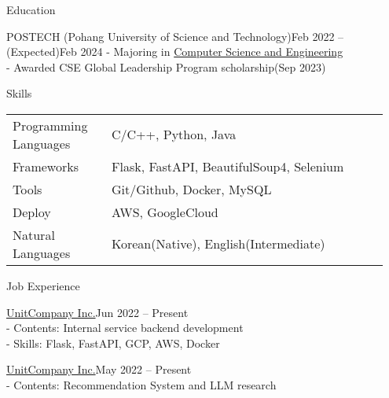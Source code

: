 \documentclass{resume}
\begin{document}
\begin{rSection}{Education}
    \begin{rSubsection}{POSTECH (Pohang University of Science and Technology)}{Feb 2022 -- (Expected)Feb 2024}
        - Majoring in \href{https://cse.postech.ac.kr}{Computer Science and Engineering} \\
        - Awarded CSE Global Leadership Program scholarship(Sep 2023)
    \end{rSubsection}
\end{rSection}

\begin{rSection}{Skills}
    \begin{tabular}{@{}p{0.25\linewidth}p{0.7\linewidth}}
        Programming Languages
            & C/C++, Python, Java \\ [0.3em]
        Frameworks
            & Flask, FastAPI, BeautifulSoup4, Selenium \\ [0.3em]
        Tools
            & Git/Github, Docker, MySQL \\ [0.3em]
        Deploy
            & AWS, GoogleCloud \\ [0.3em]
        Natural Languages
            & Korean(Native), English(Intermediate)
    \end{tabular}
\end{rSection}

\begin{rSection}{Job Experience}
    \begin{rSubsection}{\href{https://unitcompany.co.kr}{UnitCompany Inc.}}{Jun 2022 -- Present}
        {\bfseries{}} \\
        - Contents: Internal service backend development \\
        - Skills: Flask, FastAPI, GCP, AWS, Docker
    \end{rSubsection}
    \begin{rSubsection}{\href{https://unitcompany.co.kr}{UnitCompany Inc.}}{May 2022 -- Present}
        {\bfseries{}} \\
        - Contents: Recommendation System and LLM research
    \end{rSubsection}
\end{rSection}
\end{document}
